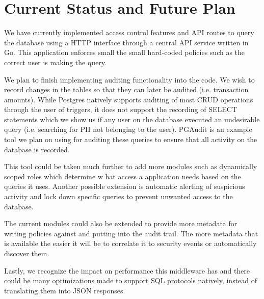 \documentclass[sigconf]{acmart}
\begin{document}
\section{Current Status and Future Plan}

We have currently implemented access control features and API routes to query the database using a HTTP interface through a central API service written in Go. This application enforces small the small hard-coded policies such as the correct user is making the query.

We plan to finish implementing auditing functionality into the code. We wish to record changes in the tables so that they can later be audited (i.e. transaction amounts).  While Postgres natively supports auditing of most CRUD operations through the user of triggers, it does not support the recording of SELECT statements which we show us if any user on the database executed an undesirable query (i.e. searching for PII not belonging to the user). PGAudit is an example tool we plan on using for auditing these queries to ensure that all activity on the database is recorded.

This tool could be taken much further to add more modules such as dynamically scoped roles which determine w hat access a application needs based  on the queries it uses. Another possible extension is automatic alerting of suspicious activity and lock down specific queries to prevent unwanted access to the database.

The current modules could also be extended to provide more metadata for writing policies against and putting into the audit trail. The more metadata that is available the easier it will be to correlate it to security events or automatically discover them.

Lastly, we recognize the impact on performance this middleware has and there could be many optimizations made to support SQL protocols natively, instead of translating them into JSON responses.
\end{document}
